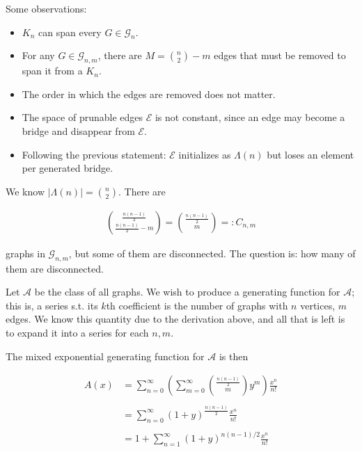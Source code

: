 \documentclass[a4paper, 12pt]{article}
\begin{document}
Some observations:

\begin{itemize}
    \item $K_n$ can span every $G \in \mathcal{G}_n$.
    \item For any $G \in \mathcal{G}_{n, m}$, there are $M = \binom{n}{2} - m$ edges that must be 
        removed to span it from a $K_n$.
    \item The order in which the edges are removed does not matter.
    \item The space of prunable edges $\mathcal{E}$ is not constant, since an edge may become 
        a bridge and disappear from $\mathcal{E}$.
    \item Following the previous statement: $\mathcal{E}$ initializes as $\Lambda(n)$ but 
        loses an element per generated bridge.
\end{itemize}

We know $|\Lambda(n)| = \binom{n}{2}$. There are 

\begin{align*}
    \binom{\frac{n(n-1)}{2}}{\frac{n(n-1)}{2} - m} = \binom{\frac{n(n-1)}{2}}{m} =: C_{n, m}
\end{align*}

graphs in $\mathcal{G}_{n, m}$, but some of them are disconnected. The question
is: how many of them are disconnected. 

Let $\mathcal{A}$ be the class of all graphs. We wish to produce a generating
function for $\mathcal{A}$; this is, a series s.t. its $k$th coefficient is the
number of graphs with $n$ vertices, $m$ edges. We know this quantity
due to the derivation above, and all that is left is to expand it into a series
for each $n, m$.

The mixed exponential generating function for $\mathcal{A}$ is then

\begin{align*}
    A(x) &= \sum_{n=0}^{\infty}\left(\sum_{m = 0}^{\infty} \binom{\frac{n(n-1)}{2}}{m}  y^m\right) \frac{x^n}{n!}\\\\
                                                               &=\sum_{n=0}^{\infty}(1 + y)^{\frac{n(n-1)}{2}} \frac{x^n}{n!} \\\\
                                                               &= 1 + \sum_{n=1}^{\infty} (1+y)^{n(n-1)/2} \frac{x^n}{n!}
\end{align*}
\end{document}
